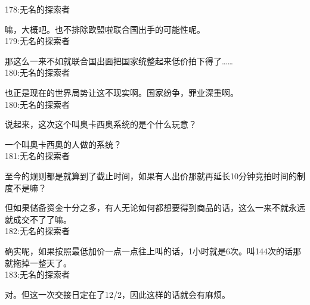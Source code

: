 178:无名的探索者

嘛，大概吧。也不排除欧盟啦联合国出手的可能性呢。\\

179:无名的探索者

那这么一来不如就联合国出面把国家统整起来低价拍下得了……\\

180:无名的探索者

也正是现在的世界局势让这不现实啊。国家纷争，罪业深重啊。\\

180:无名的探索者

说起来，这次这个叫奥卡西奥系统的是个什么玩意？

一个叫奥卡西奥的人做的系统？\\

181:无名的探索者

至今的规则都是就算到了截止时间，如果有人出价那就再延长10分钟竞拍时间的制度不是嘛？

但如果储备资金十分之多，有人无论如何都想要得到商品的话，这么一来不就永远就成交不了了嘛。\\

182:无名的探索者

确实呢，如果按照最低加价一点一点往上叫的话，1小时就是6次。叫144次的话那就拖掉一整天了。\\

183:无名的探索者

对。但这一次交接日定在了12/2，因此这样的话就会有麻烦。

